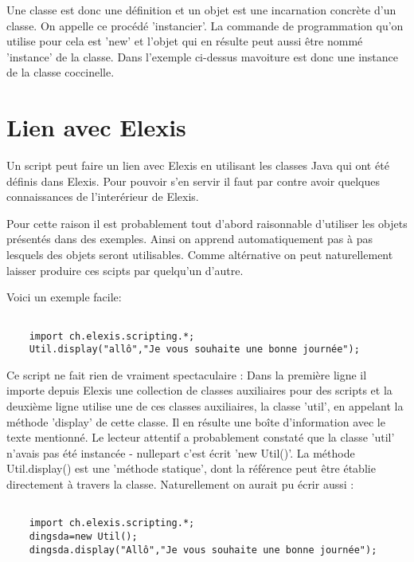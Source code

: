 \documentclass[a4paper]{scrartcl}
\begin{document}
\medskip

Une classe est donc une définition et un objet est une incarnation concrète d'un classe. On appelle ce procédé 'instancier'. La commande de programmation qu'on utilise pour cela est 'new' et l'objet qui en résulte peut aussi être nommé 'instance' de la classe. Dans l'exemple ci-dessus mavoiture est donc une instance de la classe coccinelle.

\section{Lien avec Elexis}
Un script peut faire un lien avec Elexis en utilisant les classes Java qui ont été définis dans Elexis. Pour pouvoir s'en servir il faut par contre avoir quelques connaissances de l'interérieur de Elexis.

Pour cette raison il est probablement tout d'abord raisonnable d'utiliser les objets présentés dans des exemples. Ainsi on apprend automatiquement pas à pas lesquels des objets seront utilisables. Comme altérnative on peut naturellement laisser produire ces scipts par quelqu'un d'autre.

Voici un exemple facile:

\begin{small}
\begin{verbatim}

    import ch.elexis.scripting.*;	
    Util.display("allô","Je vous souhaite une bonne journée");

\end{verbatim}
\end{small}


Ce script ne fait rien de vraiment spectaculaire : Dans la première ligne il importe depuis Elexis une collection de classes auxiliaires pour des scripts et la deuxième ligne utilise une de ces classes auxiliaires, la classe 'util', en appelant la méthode 'display' de cette classe. Il en résulte une boîte d'information avec le texte mentionné. Le lecteur attentif a probablement constaté que la classe 'util' n'avais pas été instancée - nullepart c'est écrit 'new Util()'. La méthode Util.display() est une 'méthode statique', dont la référence peut être établie directement à travers la classe. Naturellement on aurait pu écrir aussi  :
\begin{small}
\begin{verbatim}

    import ch.elexis.scripting.*;	
    dingsda=new Util();
    dingsda.display("Allô","Je vous souhaite une bonne journée");

\end{verbatim}
\end{small}
\end{document}
